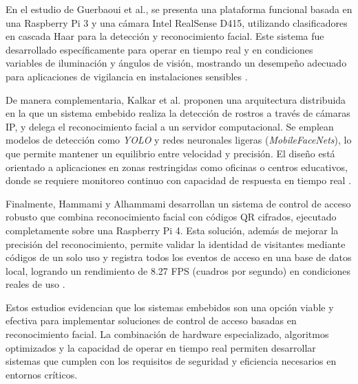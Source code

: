 En el estudio de Guerbaoui et al., se presenta una plataforma funcional basada en una Raspberry Pi 3 y una cámara Intel RealSense D415, utilizando clasificadores en cascada Haar para la detección y reconocimiento facial. Este sistema fue desarrollado específicamente para operar en tiempo real y en condiciones variables de iluminación y ángulos de visión, mostrando un desempeño adecuado para aplicaciones de vigilancia en instalaciones sensibles \cite{guerbaoui_2025}.

De manera complementaria, Kalkar et al. proponen una arquitectura distribuida en la que un sistema embebido realiza la detección de rostros a través de cámaras IP, y delega el reconocimiento facial a un servidor computacional. Se emplean modelos de detección como \textit{YOLO} y redes neuronales ligeras (\textit{MobileFaceNets}), lo que permite mantener un equilibrio entre velocidad y precisión. El diseño está orientado a aplicaciones en zonas restringidas como oficinas o centros educativos, donde se requiere monitoreo continuo con capacidad de respuesta en tiempo real \cite{kalkar_2020}.

Finalmente, Hammami y Alhammami desarrollan un sistema de control de acceso robusto que combina reconocimiento facial con códigos QR cifrados, ejecutado completamente sobre una Raspberry Pi 4. Esta solución, además de mejorar la precisión del reconocimiento, permite validar la identidad de visitantes mediante códigos de un solo uso y registra todos los eventos de acceso en una base de datos local, logrando un rendimiento de 8.27 FPS (cuadros por segundo) en condiciones reales de uso \cite{hammami_2024}.

Estos estudios evidencian que los sistemas embebidos son una opción viable y efectiva para implementar soluciones de control de acceso basadas en reconocimiento facial. La combinación de hardware especializado, algoritmos optimizados y la capacidad de operar en tiempo real permiten desarrollar sistemas que cumplen con los requisitos de seguridad y eficiencia necesarios en entornos críticos.
